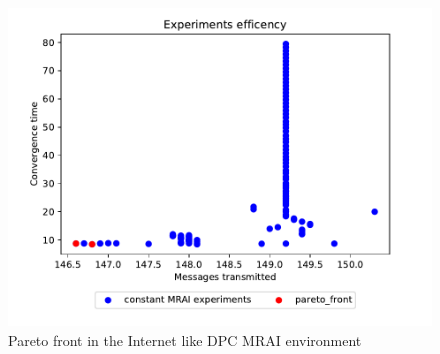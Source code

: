 \documentclass[10pt,conference,letterpaper]{IEEEtran}
\newcommand{\figwidth}{0.78}
\newcommand{\figvspace}{-1.5em}
\begin{document}
\begin{figure}[tb]
	\centering
	\includegraphics[width=\figwidth\columnwidth]{images/internet_like/graph-100-dpc/pareto-internet_like-dpc}
	\caption{Pareto front in the Internet like \ac{DPC} \ac{MRAI} environment}
	\label{fig:dpc_mrai_pareto_freq}
	\vspace{\figvspace}
\end{figure}
\end{document}
